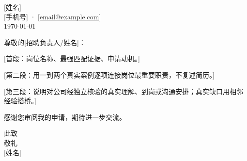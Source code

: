 \documentclass[11pt,a4paper]{ctexart}
\begin{document}
\begin{flushright}
  \mbox{[姓名]}\\
\mbox{[手机号]} · \href{mailto:[email@example.com]}{[email@example.com]}\\
\today
\end{flushright}

\vspace{1em}
\noindent 尊敬的[招聘负责人/姓名]：

[首段：岗位名称、最强匹配证据、申请动机。]

[第二段：用一到两个真实案例逐项连接岗位最重要职责，不复述简历。]

[第三段：说明对公司经独立核验的真实理解、到岗或沟通安排；真实缺口用相邻经验搭桥。]

感谢您审阅我的申请，期待进一步交流。

\begin{flushright}
此致\\敬礼\\[1em]
[姓名]
\end{flushright}
\end{document}
